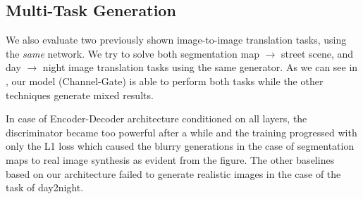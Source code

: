 
\subsection{Multi-Task Generation }
We also evaluate two previously shown image-to-image translation tasks, using the {\em same} network. 
We try to solve both segmentation map $\rightarrow$ street scene, and day $\rightarrow$ night image translation tasks using the same generator. 
As we can see in , our model (Channel-Gate) is able to perform both tasks while the other techniques generate mixed results. 

In case of Encoder-Decoder architecture \cite{huang2018multimodal} conditioned on all layers, the discriminator became too powerful after a while and the training progressed with only the L1 loss which caused the blurry generations in the case of segmentation maps to real image synthesis as evident from the figure. The other baselines based on our  architecture failed to generate realistic images in the case of the task of day2night.



